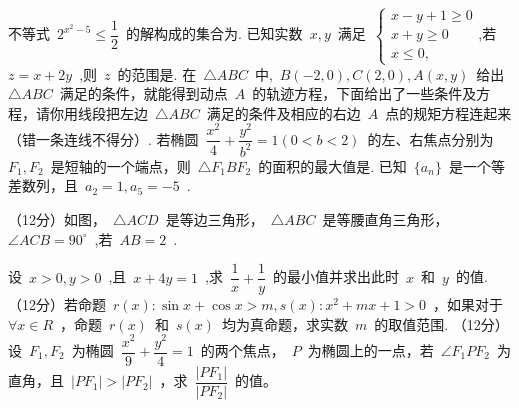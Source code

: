 \documentclass{BHCexam}
\begin{document}
\begin{questions}
\tiankong
\question 不等式~$2^{x^2-5}\leq \dfrac{1}{2}$~的解构成的集合为\mtk{}.
\question 已知实数~$x,y$~满足~$ \begin{cases}
x-y+1\geq 0\\
x+y\geq 0 \\
x\leq 0,
\end{cases}$,若~$z=x+2y$~,则~$z$~的范围是\mtk{}.
\question 在~$\triangle ABC$~中,~$B(-2,0),C(2,0),A(x,y)$~给出~$\triangle ABC$~满足的条件，就能得到动点~$A$~的轨迹方程，下面给出了一些条件及方程，请你用线段把左边~$\triangle ABC$~满足的条件及相应的右边~$A$~点的规矩方程连起来（错一条连线不得分）.
\question 若椭圆~$\dfrac{x^2}{4}+\dfrac{y^2}{b^2}=1(0<b<2)$~的左、右焦点分别为~$F_1,F_2$~是短轴的一个端点，则~$\triangle F_1BF_2$~的面积的最大值是\mtk{}.
\jianda
\question 已知~$\{a_n \}$~是一个等差数列，且~$a_2=1,a_5=-5$~.
\vspace{8cm}
\question （12分）如图，~$\triangle ACD$~是等边三角形，~$\triangle ABC$~是等腰直角三角形，~$\angle ACB=90^ {\circ}$~,若~$AB=2$~.
\begin{flushright}
\end{flushright}
\vspace{3cm}
\question 设~$x>0,y>0$~,且~$x+4y=1$~,求~$\dfrac{1}{x}+\dfrac{1}{y}$~的最小值并求出此时~$x$~和~$y$~的值.
\vspace{6cm}
\question （12分）若命题~$r(x):\sin x+\cos x>m,s(x):x^2+mx+1>0$~，如果对于~$\forall x\in R$~，命题~$r(x)$~和~$s(x)$~均为真命题，求实数~$m$~的取值范围.
\vspace{8cm}
\question （12分）设~$F_1,F_2$~为椭圆~$\dfrac{x^2}{9}+\dfrac{y^2}{4}=1$~的两个焦点，~$P$~为椭圆上的一点，若~$\angle F_1PF_2$~为直角，且~$|PF_1|>|PF_2|$~，求~$\dfrac{|PF_1|}{|PF_2|}$~的值。
\end{questions}
\end{document}
